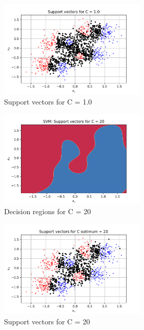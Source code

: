 \documentclass[a4paper]{article}    %
\begin{document}
\begin{figure}[H]
    \hfill
    \begin{subfigure}{0.45\textwidth}
        \centering
        \includegraphics[width=7cm]{support_vectors_C_1}
        \caption{Support vectors for C = 1.0}
        \label{fig:svm-support_vectors_C_1}
    \end{subfigure}
    \begin{subfigure}{0.45\textwidth}
        \centering
        \includegraphics[width=7cm]{decision_region_C_20}
        \caption{Decision regions for C = 20}
        \label{fig:svm-decision_region_C_20}
    \end{subfigure}
    \hfill
    \begin{subfigure}{0.45\textwidth}
        \centering
        \includegraphics[width=7cm]{support_vectors_C_20}
        \caption{Support vectors for C = 20}
        \label{fig:svm-support_vectors_C_20}
    \end{subfigure}
    \begin{subfigure}{0.45\textwidth}

\end{subfigure}
\end{figure}
\end{document}
